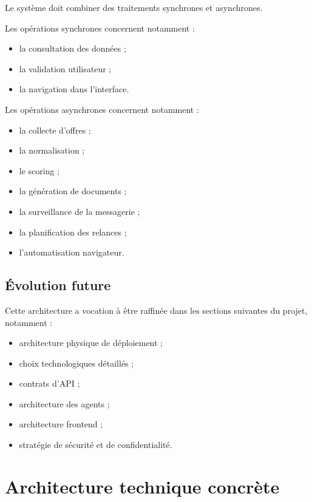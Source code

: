 \documentclass[11pt,a4paper]{article}
\begin{document}
Le système doit combiner des traitements synchrones et asynchrones.

Les opérations synchrones concernent notamment :

\begin{itemize}
    \item la consultation des données ;
    \item la validation utilisateur ;
    \item la navigation dans l’interface.
\end{itemize}

Les opérations asynchrones concernent notamment :

\begin{itemize}
    \item la collecte d’offres ;
    \item la normalisation ;
    \item le scoring ;
    \item la génération de documents ;
    \item la surveillance de la messagerie ;
    \item la planification des relances ;
    \item l’automatisation navigateur.
\end{itemize}

\subsection{Évolution future}

Cette architecture a vocation à être raffinée dans les sections suivantes du projet, notamment :

\begin{itemize}
    \item architecture physique de déploiement ;
    \item choix technologiques détaillés ;
    \item contrats d’API ;
    \item architecture des agents ;
    \item architecture frontend ;
    \item stratégie de sécurité et de confidentialité.
\end{itemize}

\section{Architecture technique concrète}
\end{document}
